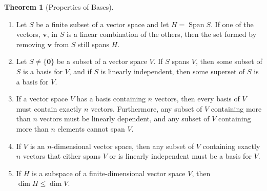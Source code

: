 \documentclass{myart}
\renewcommand{\vec}[1]{\ensuremath{\mathbf{#1}}} %
\DeclareMathOperator{\OpSpan}{Span} %
\newcommand{\set}[1]{\ensuremath{\{#1\}}} %
\theoremstyle{definition}
\newtheorem{thm}{Theorem}
\begin{document}
\begin{thm}[Properties of Bases] \hfill
\begin{enumerate}
\item Let $S$ be a finite subset of a vector space and let $H = \OpSpan S$. If one of the vectors, \vec v, in $S$ is a linear combination of the others, then the set formed by removing \vec v from $S$ still spans $H$.
\item Let $S \neq \set{\vec 0}$ be a subset of a vector space $V$. If $S$ spans $V$, then some subset of $S$ is a basis for $V$, and if $S$ is linearly independent, then some superset of $S$ is a basis for $V$.
\item If a vector space $V$ has a basis containing $n$ vectors, then every basis of $V$ must contain exactly $n$ vectors. Furthermore, any subset of $V$ containing more than $n$ vectors must be linearly dependent, and any subset of $V$ containing more than $n$ elements cannot span $V$.
\item If $V$ is an $n$-dimensional vector space, then any subset of $V$ containing exactly $n$ vectors that either spans $V$ or is linearly independent must be a basis for $V$.
\item If $H$ is a subspace of a finite-dimensional vector space $V$, then $\dim H \leq \dim V$.
\end{enumerate}
\end{thm}
\end{document}
